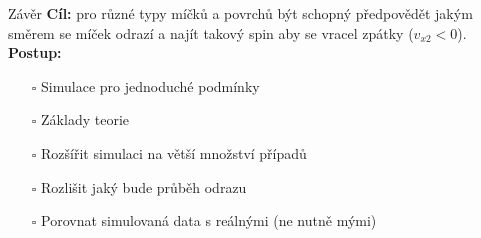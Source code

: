 \documentclass[secheader]{beamer}
\begin{document}
\begin{frame}{Závěr}
 \textbf{Cíl:} pro různé typy míčků a povrchů být schopný předpovědět jakým směrem
 se míček odrazí a najít takový spin aby se vracel zpátky ($v_{x2}<0$).
 \vfill
 \textbf{Postup:}\\
 \begin{itemize}
  \item[\rlap{\raisebox{0.3ex}{\hspace{0.4ex}\tiny \ding{52}}}$\square$]
  Simulace pro jednoduché podmínky
  
  \item[\rlap{\raisebox{0.3ex}{\hspace{0.4ex}\tiny \ding{52}}}$\square$]
  Základy teorie 
 \item[$\square$] Rozšířit simulaci na větší množství případů
 \item[$\square$] Rozlišit jaký bude průběh odrazu
 \item[$\square$] Porovnat simulovaná data s reálnými (ne nutně mými)
 \end{itemize}

\end{frame}
\end{document}
